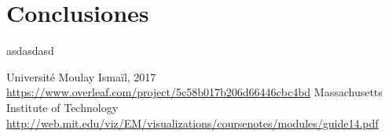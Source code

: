 \documentclass[%
 reprint,
 amsmath,amssymb,
 aps,
]{revtex4-1}
\begin{document}
\section{Conclusiones}
asdasdasd

\begin{thebibliography}{9}
Université Moulay Ismaïl, 2017
\url{https://www.overleaf.com/project/5c58b017b206d66446cbc4bd}
Massachusetts Institute of Technology
\url{http://web.mit.edu/viz/EM/visualizations/coursenotes/modules/guide14.pdf}
\end{thebibliography}
\end{document}
